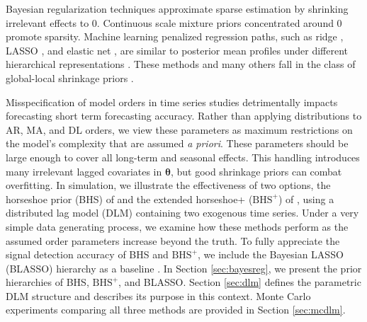 Bayesian regularization techniques approximate sparse estimation by shrinking irrelevant effects to 0. Continuous scale mixture priors concentrated around 0 promote sparsity. Machine learning penalized regression paths, such as ridge \citep{Hoerl1970}, LASSO \citep{Tibshirani1996}, and elastic net \citep{Hastie2009a}, are similar to posterior mean profiles under different hierarchical representations \citep{Hsiang1975,Park2008,Li2010}. These methods and many others fall in the class of global-local shrinkage priors \citep{Polson2010}. 

Misspecification of model orders in time series studies detrimentally impacts forecasting short term forecasting accuracy. Rather than applying distributions to AR, MA, and DL orders, we view these parameters as maximum  restrictions on the model's complexity that are assumed \textit{a priori}. These parameters should be large enough to cover all long-term and seasonal effects. This handling introduces many irrelevant lagged covariates in $\bm{\theta}$, but good shrinkage priors can combat overfitting. In simulation, we illustrate the effectiveness of two options, the horseshoe prior (BHS) of \citep{Carvalho2009,Carvalho2010} and the extended horseshoe+ ($\textrm{BHS}^+$) of \citep{Bhadra2016}, using a distributed lag model (DLM) containing two exogenous time series. Under a very simple data generating process, we examine how these methods perform as the assumed order parameters increase beyond the truth. To fully appreciate the signal detection accuracy of BHS and $\textrm{BHS}^+$, we include the Bayesian LASSO (BLASSO) hierarchy as a baseline \citep{Park2008}. In Section \ref{sec:bayesreg}, we present the prior hierarchies of BHS, $\textrm{BHS}^+$, and BLASSO. Section \ref{sec:dlm} defines the parametric DLM structure and describes its purpose in this context. Monte Carlo experiments comparing all three methods are provided in Section \ref{sec:mcdlm}.





\bigskip
